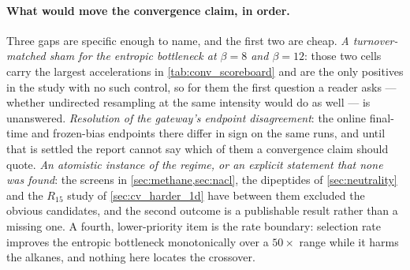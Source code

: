 \paragraph{What would move the convergence claim, in order.}
Three gaps are specific enough to name, and the first two are cheap. \emph{A turnover-matched
sham for the entropic bottleneck at $\beta=8$ and $\beta=12$}: those two cells carry the
largest accelerations in \cref{tab:conv_scoreboard} and are the only positives in the study
with no such control, so for them the first question a reader asks --- whether undirected
resampling at the same intensity would do as well --- is unanswered. \emph{Resolution of the
gateway's endpoint disagreement}: the online final-time and frozen-bias endpoints there differ
in sign on the same runs, and until that is settled the report cannot say which of them a
convergence claim should quote. \emph{An atomistic instance of the regime, or an explicit
statement that none was found}: the screens in \cref{sec:methane,sec:nacl}, the dipeptides of
\cref{sec:neutrality} and the $R_{15}$ study of \cref{sec:cv_harder_1d} have between them
excluded the obvious candidates, and the second outcome is a publishable result rather than a
missing one. A fourth, lower-priority item is the rate boundary: selection rate improves the
entropic bottleneck monotonically over a $50\times$ range while it harms the alkanes, and
nothing here locates the crossover.
